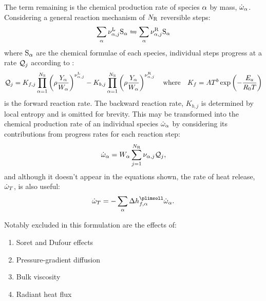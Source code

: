 The term remaining is the chemical production rate of species $\a$ by mass, $\dot{\w}_\a$. Considering a general reaction mechanism of $N_{\rm{R}}$ reversible steps:
\begin{equation}
\sum_\a \nu_{\a, j}^{\rm{L}} \rm{S}_\a \leftrightharpoons \sum_\a \nu_{\a, j}^{\rm{R}} \rm{S}_\a
\end{equation}
where $\rm{S}_\a$ are the chemical formulae of each species, individual steps progress at a rate $\cl{Q}_j$ according to \cite{poinsot2005TheoreticalNumericalCombustion}:
\begin{equation}
\cl{Q}_j = K_{f, j}\prod_{\a = 1}^{N_{\rm{S}}} \left(\r \frac{Y_\a}{W_\a}\right)^{\nu_{\a, j}^{\rm{L}}} - K_{b, j}\prod_{\a = 1}^{N_{\rm{S}}} \left(\r \frac{Y_\a}{W_\a}\right)^{\nu_{\a, j}^{\rm{R}}}
\quad \text{where} \quad
K_{f} = A T^b \exp\left(-\frac{E_a}{R_0 T}\right)
\end{equation}
is the forward reaction rate. The backward reaction rate, $K_{b, j}$ is determined by local entropy and is omitted for brevity. This may be transformed into the chemical production rate of an individual species $\dot{\w}_\a$ by considering its contributions from progress rates for each reaction step:
\begin{equation}
\dot{\w}_\a = W_\a \sum_{j = 1}^{N_\rm{R}} \nu_{\a, j} \cl{Q}_j,
\end{equation}
and although it doesn't appear in the equations shown, the rate of heat release, $\dot{\w}_T$, is also useful:
\begin{equation}
\dot{\w}_T = -\sum_\a \D h_{f, \a}^\plimsoll \dot{\w}_\a.
\end{equation}

Notably excluded in this formulation \cite{williams1985CombustionTheory} are the effects of:
\begin{enumerate}
\item Soret and Dufour effects \cite{dufour1872DiffusionThermoeffect, mortimer1980ElementaryTransitionState, soret1879LetatDequilibreQue, kohler2016SoretEffectLiquid}
\item Pressure-gradient diffusion
\item Bulk viscosity \cite{buresti2015NoteStokesHypothesis}
\item Radiant heat flux
\end{enumerate}





